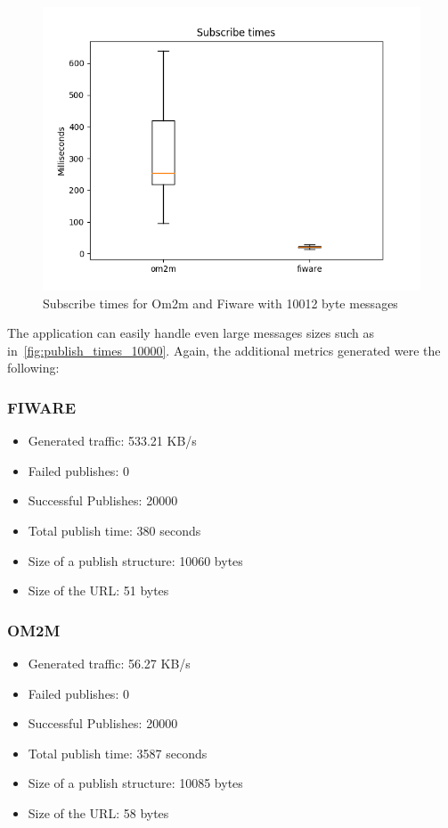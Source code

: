 \documentclass[conference]{IEEEtran}
\begin{document}
\begin{figure}[htbp!]
  \centering
  \includegraphics[width=\columnwidth]{figures/om2m_fiware_subscribe_times_10000.png}
  \caption{Subscribe times for Om2m and Fiware with 10012 byte messages}
  \label{fig:subscribe_times_10000}
\end{figure}

The application can easily handle even large messages sizes such as in~\ref{fig:publish_times_10000}. Again, the additional metrics generated were the following:

\subsubsection{FIWARE}
\begin{itemize}
\item Generated traffic: 533.21 KB/s
\item Failed publishes: 0
\item Successful Publishes: 20000
\item Total publish time: 380 seconds
\item Size of a publish structure: 10060 bytes
\item Size of the URL: 51 bytes
\end{itemize}

\subsubsection{OM2M}
\begin{itemize}
\item Generated traffic: 56.27 KB/s
\item Failed publishes: 0
\item Successful Publishes: 20000
\item Total publish time: 3587 seconds
\item Size of a publish structure: 10085 bytes
\item Size of the URL: 58 bytes
\end{itemize}
\end{document}
